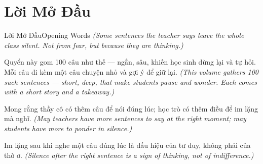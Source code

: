 \chapter*{Lời Mở Đầu}

\begin{truyen}{Lời Mở Đầu}{Opening Words}
\textit{(Some sentences the teacher says leave the whole class silent. Not from fear, but because they are thinking.)}

Quyển này gom 100 câu như thế — ngắn, sâu, khiến học sinh dừng lại và tự hỏi. Mỗi câu đi kèm một câu chuyện nhỏ và gợi ý để giữ lại.
\textit{(This volume gathers 100 such sentences — short, deep, that make students pause and wonder. Each comes with a short story and a takeaway.)}

Mong rằng thầy cô có thêm câu để nói đúng lúc; học trò có thêm điều để im lặng mà nghĩ.
\textit{(May teachers have more sentences to say at the right moment; may students have more to ponder in silence.)}
\end{truyen}

\begin{baihoc}
Im lặng sau khi nghe một câu đúng lúc là dấu hiệu của tư duy, không phải của thờ ơ.
\textit{(Silence after the right sentence is a sign of thinking, not of indifference.)}
\end{baihoc}
\ngancach
